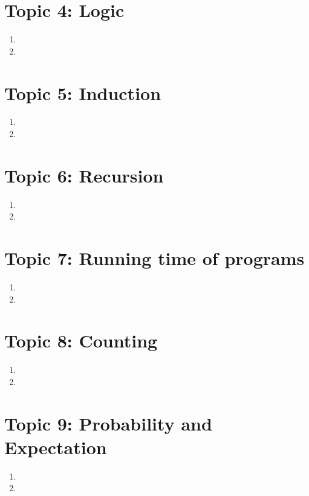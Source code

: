 \documentclass[11pt, a4paper]{article}
\begin{document}
\section*{Topic 4: Logic}
    \begin{enumerate}
        \item
        \item
    \end{enumerate}

\section*{Topic 5: Induction}
    \begin{enumerate}
        \item
        \item
    \end{enumerate}

\section*{Topic 6: Recursion}
    \begin{enumerate}
        \item
        \item
    \end{enumerate}

\section*{Topic 7: Running time of programs}
    \begin{enumerate}
        \item
        \item
    \end{enumerate}

\section*{Topic 8: Counting}
    \begin{enumerate}
        \item
        \item
    \end{enumerate}

\section*{Topic 9: Probability and Expectation}
    \begin{enumerate}
        \item
        \item
    \end{enumerate}
\end{document}
